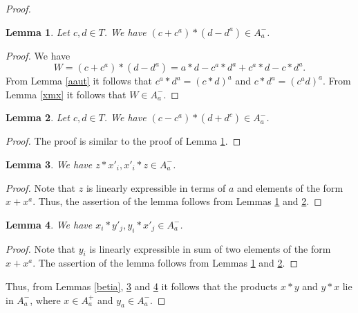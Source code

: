 \documentclass[12pt]{article}
\newtheorem{lem}{Lemma}
\begin{document}
\begin{proof}
	\begin{lem}\label{cd}
	Let $c,d\in T$. We have $(c+c^a)*(d-d^a)\in A^-_a$.
	\end{lem}
	\begin{proof}
	We have $$W=(c+c^a)*(d-d^a)=a*d-c^a*d^a+c^a*d-c*d^a.$$
From Lemma \ref{aaut} it follows that $c^a*d^a=(c*d)^a$ and $c*d^a=(c^ad)^a$.
From Lemma \ref{xmx} it follows that $W\in A^-_a$.

	\end{proof}
	
	\begin{lem}\label{dc}
	Let $c,d\in T$. We have $(c-c^a)*(d+d^c)\in A^-_a$.
	\end{lem}
	\begin{proof}
The proof is similar to the proof of Lemma \ref{cd}.
	\end{proof}

	\begin{lem}\label{zbet}
	We have $z*x'_i, x'_i*z\in A^-_a$.
	\end{lem}
	\begin{proof}
Note that $z$ is linearly expressible in terms of $a$ and elements of the form $x+x^a$. Thus, the assertion of the lemma follows from Lemmas \ref{cd} and \ref{dc}.

	\end{proof}
	
	\begin{lem}\label{alpbet}
	We have $x_i*y'_j, y_i*x'_j\in A^-_a$.
    \end{lem}	 
	\begin{proof}
		Note that $y_i$ is linearly expressible in sum of two elements of the form $x+x^a$. The assertion of the lemma follows from Lemmas \ref{cd} and \ref{dc}.
	\end{proof} 
Thus, from Lemmas \ref{betia}, \ref{zbet} and \ref{alpbet} it follows that the products $x*y$ and $y*x$ lie in $A_a^- $, where $x\in A_a^+$ and $y_a\in A^-_a$.
	 

\end{proof}
\end{document}
